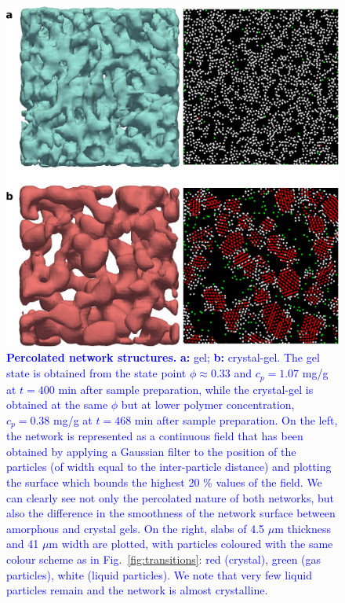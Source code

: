 \documentclass[preprint,amsmath,amssymb,superscriptaddress]{revtex4-1}
\begin{document}
\clearpage

\begin{figure}[!t]
 \centering
 \includegraphics[width=12cm]{fig2}
\caption{\textcolor{blue}{{\bf Percolated network structures.} {\bf a:} gel; {\bf b:} crystal-gel. The gel state is obtained from the state
point $\phi\approx 0.33$ and $c_p=1.07$ mg/g at $t=400$ min after sample preparation, while the crystal-gel is obtained at the same $\phi$ but
at lower polymer concentration, $c_p=0.38$ mg/g at $t=468$ min after sample preparation. On the left, the network is represented as a continuous field that has
been obtained by applying a Gaussian filter to the position of the particles (of width equal to the inter-particle distance) and
plotting the surface which bounds the highest 20 \% values of the field. We can clearly see not only the percolated nature of both networks, 
but also the difference in the smoothness of the network surface between amorphous and crystal gels. 
On the right, slabs of 4.5 $\mu$m thickness and 41 $\mu$m width are plotted,
with particles coloured with the same colour scheme as in Fig.~\ref{fig:transitions}: red (crystal), green (gas particles), white (liquid particles). 
We note that very few liquid particles remain and the network is almost crystalline. 
}} 
\label{fig:network}
\end{figure}

\clearpage
\end{document}
